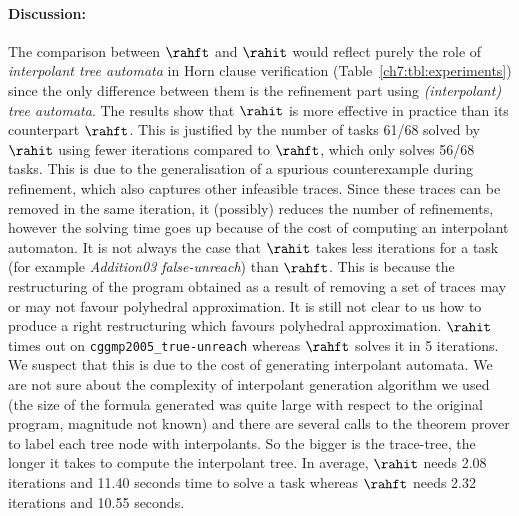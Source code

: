 \paragraph{Discussion:}
The comparison between $\rahft$ and $\rahit$ would reflect purely the role of \emph{interpolant tree automata} in Horn clause verification (Table~\ref{ch7:tbl:experiments}) since the only difference between them is the refinement part using \emph{(interpolant) tree automata}. 
The results show that $\rahit$ is more effective in practice than its counterpart $\rahft$. This is justified by the  number of tasks 61/68 solved by $\rahit$ using fewer iterations  compared to $\rahft$, which only solves 56/68 tasks.   This is due to the generalisation of a spurious counterexample during refinement, which also captures other infeasible traces. Since these traces  can be removed in the same iteration,  it (possibly) reduces the number of refinements, however the solving time goes up because of the cost of computing an interpolant automaton.  It is not always the case that $\rahit$ takes less iterations for a task (for example  \emph{Addition03 false-unreach}) than $\rahft$. This is because  the  restructuring of the program obtained  as a result of removing a set of traces may  or may not favour   polyhedral approximation. It is still not clear to us how to produce a right  restructuring which favours  polyhedral approximation.  $\rahit$ times out on \texttt{cggmp2005\_true-unreach}  whereas  $\rahft$ solves it in 5 iterations. We suspect that this is due to the cost of generating  interpolant automata. We are not sure about the complexity of interpolant generation algorithm we used (the size of the formula generated was quite large with respect to the original program, magnitude not known) and there are several calls to the  theorem prover to label each tree node with interpolants.  So the bigger is the trace-tree, the longer it takes to compute the interpolant tree.  In average,  $\rahit$  needs 2.08 iterations and 11.40 seconds time to solve a task whereas $\rahft$ needs 2.32 iterations and 10.55 seconds.




